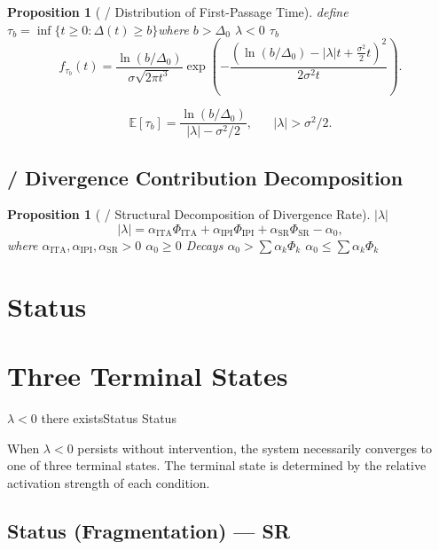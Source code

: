 \documentclass[11pt,a4paper]{article}
\newtheorem{proposition}[theorem]{Proposition}
\theoremstyle{remark}
\newcommand{\E}{\mathbb{E}}
\newcommand{\paren}[1]{\left(#1\right)}
\newcommand{\ineq}{\Delta}
\newcommand{\lambdaparam}{\lambda}
\begin{document}
\begin{proposition}[ / Distribution of First-Passage Time]
\label{prop:first_passage}
define $\tau_b = \inf\{t \geq 0 : \ineq(t) \geq b\}$where $b > \ineq_0$
 $\lambdaparam < 0$ $\tau_b$ 
\[
f_{\tau_b}(t) = \frac{\ln(b/\ineq_0)}{\sigma \sqrt{2\pi t^3}}
\exp\paren{-\frac{\paren{\ln(b/\ineq_0) - |\lambdaparam| t + \frac{\sigma^2}{2} t}^2}{2\sigma^2 t}}.
\]

\[
\E[\tau_b] = \frac{\ln(b/\ineq_0)}{|\lambdaparam| - \sigma^2/2},
\quad \text{ } |\lambdaparam| > \sigma^2/2.
\]
\end{proposition}

\subsection{ / Divergence Contribution Decomposition}

\begin{proposition}[ / Structural Decomposition of Divergence Rate]
\label{prop:divergence_decomp}
 $|\lambdaparam|$ 
\[
|\lambdaparam| = \alpha_{\text{ITA}} \Phi_{\text{ITA}} + 
                \alpha_{\text{IPI}} \Phi_{\text{IPI}} + 
                \alpha_{\text{SR}} \Phi_{\text{SR}} - \alpha_0,
\]
where $\alpha_{\text{ITA}}, \alpha_{\text{IPI}}, \alpha_{\text{SR}} > 0$ 
$\alpha_0 \geq 0$ Decays
 $\alpha_0 > \sum \alpha_k \Phi_k$ 
 $\alpha_0 \leq \sum \alpha_k \Phi_k$ 
\end{proposition}

\section{Status}
\section{Three Terminal States}

 $\lambdaparam < 0$ there existsStatus
Status

When $\lambdaparam < 0$ persists without intervention, the system necessarily converges
to one of three terminal states. The terminal state is determined by the relative
activation strength of each condition.

\subsection{Status (Fragmentation) — SR }
\end{document}
